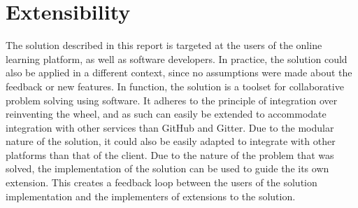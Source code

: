 \section{Extensibility}

The solution described in this report is targeted at the users of the online learning platform, as well as software developers. In practice, the solution could also be applied in a different context, since no assumptions were made about the feedback or new features. In function, the solution is a toolset for collaborative problem solving using software. It adheres to the principle of integration over reinventing the wheel, and as such can easily be extended to accommodate integration with other services than GitHub and Gitter. Due to the modular nature of the solution, it could also be easily adapted to integrate with other platforms than that of the client. Due to the nature of the problem that was solved, the implementation of the solution can be used to guide the its own extension. This creates a feedback loop between the users of the solution implementation and the implementers of extensions to the solution.
